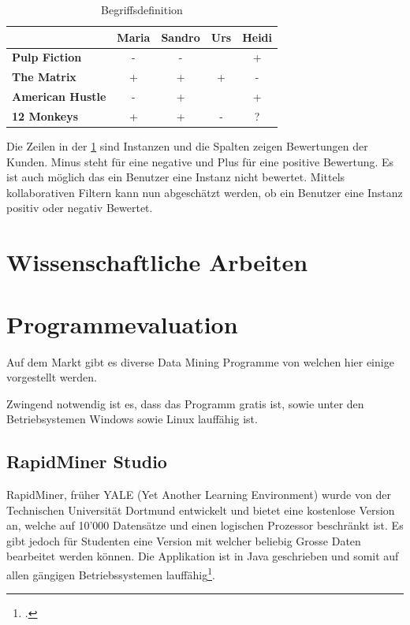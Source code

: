 \begin{table}[H] 
	\caption{Begriffsdefinition}
	\centering
	\label{fig:recherche:dataminingtechniken:disziplinen:collaborativefiltering}
	
	\begin{tabular}{ | l | c | c | c | c |} 
		\hline 
		\rowcolor{tableheadcolor}
		\bfseries & 
		\bfseries Maria & 
		\bfseries Sandro & 
		\bfseries Urs & 
		\bfseries Heidi \\ \hline 
		\textbf{Pulp Fiction} & - & - &  & + \\ \hline 
		\textbf{The Matrix} & + & + & + & - \\ \hline 
		\textbf{American Hustle} & - & + &  & + \\ \hline 
		\textbf{12 Monkeys} & + & + & - & \cellcolor{yellow!75}? \\ \hline 
	\end{tabular} 
\end{table}

Die Zeilen in der \cref{fig:recherche:dataminingtechniken:disziplinen:collaborativefiltering} sind Instanzen und die Spalten zeigen Bewertungen der Kunden. Minus steht für eine negative und Plus für eine positive Bewertung. Es ist auch möglich das ein Benutzer eine Instanz nicht bewertet. Mittels kollaborativen Filtern kann nun abgeschätzt werden, ob ein Benutzer eine Instanz positiv oder negativ Bewertet.

\section{Wissenschaftliche Arbeiten}
\todo{}

\section{Programmevaluation}
\label{sec:recherche:programmevaluation}
Auf dem Markt gibt es diverse Data Mining Programme von welchen hier einige vorgestellt werden.

Zwingend notwendig ist es, dass das Programm gratis ist, sowie unter den Betriebsystemen Windows sowie Linux lauffähig ist. 


\subsection{RapidMiner Studio}
RapidMiner, früher YALE (Yet Another Learning Environment) wurde von der Technischen Universität Dortmund entwickelt und bietet eine kostenlose Version an, welche auf 10'000 Datensätze und einen logischen Prozessor beschränkt ist. Es gibt jedoch für Studenten eine Version mit welcher beliebig Grosse Daten bearbeitet werden können. Die Applikation ist in Java geschrieben und somit auf allen gängigen Betriebssystemen lauffähig\footcite{RapidMiner_Studio_2017-01-14}.

